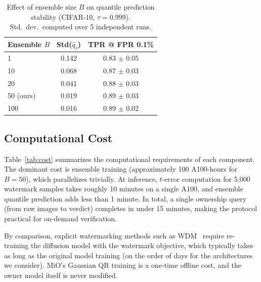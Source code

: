 \documentclass{article}
\begin{document}
\begin{table}[h]
\caption{Effect of ensemble size $B$ on quantile prediction stability (CIFAR-10, $\tau = 0.999$). Std.\ dev.\ computed over 5 independent runs.}
\label{tab:ensemble_ablation}
\vskip 0.1in
\begin{center}
\begin{small}
\begin{tabular}{lcc}
\toprule
Ensemble $B$ & Std($\hat{q}_\tau$) & TPR @ FPR 0.1\% \\
\midrule
1 & 0.142 & 0.83 $\pm$ 0.05 \\
10 & 0.068 & 0.87 $\pm$ 0.03 \\
20 & 0.041 & 0.88 $\pm$ 0.03 \\
50 (ours) & 0.019 & 0.89 $\pm$ 0.03 \\
100 & 0.016 & 0.89 $\pm$ 0.02 \\
\bottomrule
\end{tabular}
\end{small}
\end{center}
\end{table}

\subsection{Computational Cost}
\label{app:cost}

Table~\ref{tab:cost} summarizes the computational requirements of each component. The dominant cost is ensemble training (approximately 100 A100-hours for $B = 50$), which parallelizes trivially. At inference, $t$-error computation for 5{,}000 watermark samples takes roughly 10 minutes on a single A100, and ensemble quantile prediction adds less than 1 minute. In total, a single ownership query (from raw images to verdict) completes in under 15 minutes, making the protocol practical for on-demand verification.

By comparison, explicit watermarking methods such as WDM~\citep{peng2023protecting} require re-training the diffusion model with the watermark objective, which typically takes as long as the original model training (on the order of days for the architectures we consider). MiO's Gaussian QR training is a one-time offline cost, and the owner model itself is never modified.
\end{document}

